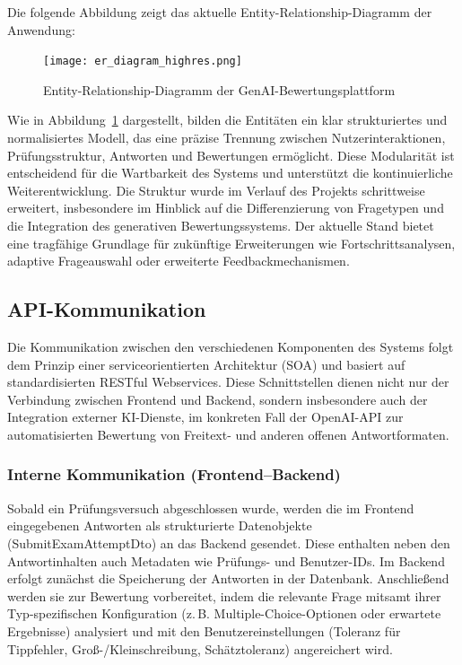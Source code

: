 \documentclass[a4paper,12pt]{article}
\begin{document}
Die folgende Abbildung zeigt das aktuelle Entity-Relationship-Diagramm der Anwendung:

\vspace{1em}
\begin{figure}[h]
\centering
\texttt{[image: er\_diagram\_highres.png]}
\caption{Entity-Relationship-Diagramm der GenAI-Bewertungsplattform}
\label{fig:erd}
\end{figure}
\vspace{1em}

Wie in Abbildung~\ref{fig:erd} dargestellt, bilden die Entitäten ein klar strukturiertes und normalisiertes Modell, das eine präzise Trennung zwischen Nutzerinteraktionen, Prüfungsstruktur, Antworten und Bewertungen ermöglicht. Diese Modularität ist entscheidend für die Wartbarkeit des Systems und unterstützt die kontinuierliche Weiterentwicklung. Die Struktur wurde im Verlauf des Projekts schrittweise erweitert, insbesondere im Hinblick auf die Differenzierung von Fragetypen und die Integration des generativen Bewertungssystems. Der aktuelle Stand bietet eine tragfähige Grundlage für zukünftige Erweiterungen wie Fortschrittsanalysen, adaptive Frageauswahl oder erweiterte Feedbackmechanismen.

\subsection{API-Kommunikation}
Die Kommunikation zwischen den verschiedenen Komponenten des Systems folgt dem Prinzip einer serviceorientierten Architektur (SOA) und basiert auf standardisierten RESTful Webservices. Diese Schnittstellen dienen nicht nur der Verbindung zwischen Frontend und Backend, sondern insbesondere auch der Integration externer KI-Dienste, im konkreten Fall der OpenAI-API zur automatisierten Bewertung von Freitext- und anderen offenen Antwortformaten.

\subsubsection{Interne Kommunikation (Frontend–Backend)}
Sobald ein Prüfungsversuch abgeschlossen wurde, werden die im Frontend eingegebenen Antworten als strukturierte Datenobjekte (SubmitExamAttemptDto) an das Backend gesendet. Diese enthalten neben den Antwortinhalten auch Metadaten wie Prüfungs- und Benutzer-IDs. Im Backend erfolgt zunächst die Speicherung der Antworten in der Datenbank. Anschließend werden sie zur Bewertung vorbereitet, indem die relevante Frage mitsamt ihrer Typ-spezifischen Konfiguration (z. B. Multiple-Choice-Optionen oder erwartete Ergebnisse) analysiert und mit den Benutzereinstellungen (Toleranz für Tippfehler, Groß-/Kleinschreibung, Schätztoleranz) angereichert wird.
\end{document}
